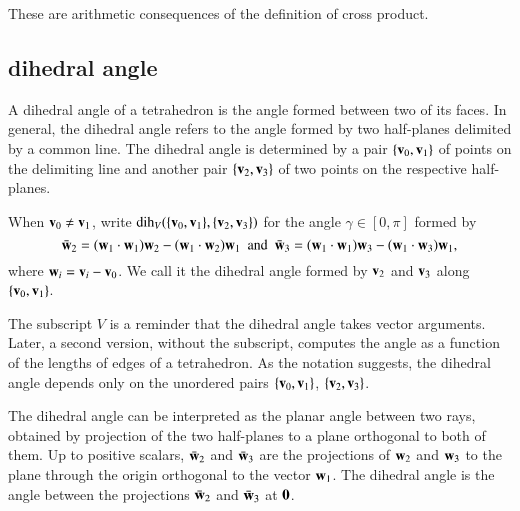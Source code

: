 \begin{proved}
These are arithmetic consequences of the definition of cross product.
\swallowed\end{proved}



\subsection{dihedral angle}

A dihedral angle of a tetrahedron is the angle formed between two of
its faces. In general, the dihedral angle refers to the angle formed
by two half-planes delimited by a common line.  The dihedral angle is
determined by a pair $\{{\mathbf v}_0,{\mathbf v}_1\}$ of points on the delimiting line
and another pair $\{{\mathbf v}_2,{\mathbf v}_3\}$ of two points on the respective
half-planes.  %
%
%
%
%

\begin{definition}\label{def:dih}
 When ${\mathbf v}_0\ne {\mathbf v}_1$,
  write $\operatorname{dih}_V(\{{\mathbf v}_0,{\mathbf v}_1\},\{{\mathbf v}_2,{\mathbf v}_3\})$ for the angle
  $\gamma\in[0,\pi]$ formed by
\[ 
\bar {{\mathbf w}}_2 = ({\mathbf w}_1\cdot {\mathbf w}_1) {\mathbf w}_2 - ({\mathbf w}_1\cdot {\mathbf w}_2) {\mathbf w}_1\text{ \ and \ }  \bar {{\mathbf w}}_3 =
({\mathbf w}_1\cdot {\mathbf w}_1) {\mathbf w}_3 - ({\mathbf w}_1\cdot {\mathbf w}_3) {\mathbf w}_1,
\] 
where ${\mathbf w}_i={\mathbf v}_i-{\mathbf v}_0$.  We call it
the dihedral angle formed by ${\mathbf v}_2$ and ${\mathbf v}_3$ along $\{{\mathbf v}_0,{\mathbf v}_1\}$.
%
%
\end{definition}
The subscript $V$ is a reminder 
that the dihedral angle takes vector arguments.
Later, a second version, without the subscript, 
computes the angle as a function of the lengths of edges of a 
tetrahedron.
%
%
As the notation suggests, the dihedral angle depends only
on the unordered pairs $\{{\mathbf v}_0,{\mathbf v}_1\}$, $\{{\mathbf v}_2,{\mathbf v}_3\}$.

\figGJRSLPT %


The dihedral angle can be interpreted as the planar angle between two rays, obtained by
projection of the two half-planes to a plane orthogonal to both of
them.  Up to positive scalars, $\bar {{\mathbf w}}_2$ and $\bar {{\mathbf w}}_3$ are the
projections of ${\mathbf w}_2$ and ${\mathbf w}_3$ to the plane through the origin
orthogonal to the vector ${\mathbf w}_1$.  The dihedral angle is the angle
between the projections $\bar {{\mathbf w}}_2$ and $\bar {{\mathbf w}}_3$ at ${\mathbf 0}$.

